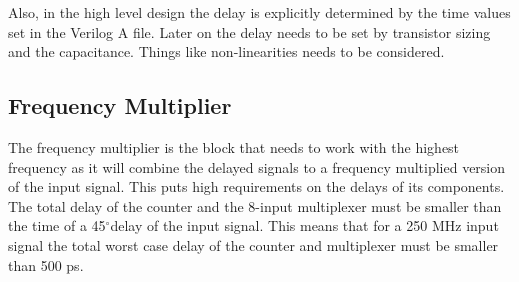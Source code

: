 \documentclass[a4paper,12pt]{article} \usepackage{graphicx}
\newcommand{\degree}{\ensuremath{^\circ}}
\begin{document}
Also, in the high level design the delay is explicitly determined by
the time values set in the Verilog A file. Later on the delay needs to
be set by transistor sizing and the capacitance. Things like
non-linearities needs to be considered.

\subsection{Frequency Multiplier}
The frequency multiplier is the block that needs to work with the highest 
frequency as it will combine the delayed signals to a frequency multiplied 
version of the input signal. This puts high requirements on the delays of its
components. The total delay of the counter and the 8-input multiplexer
must be smaller than the time of a 45\degree  delay of the input signal.
This means that for a 250 MHz input signal the total worst case delay of the
counter and multiplexer must be smaller than 500 ps.
\end{document}
